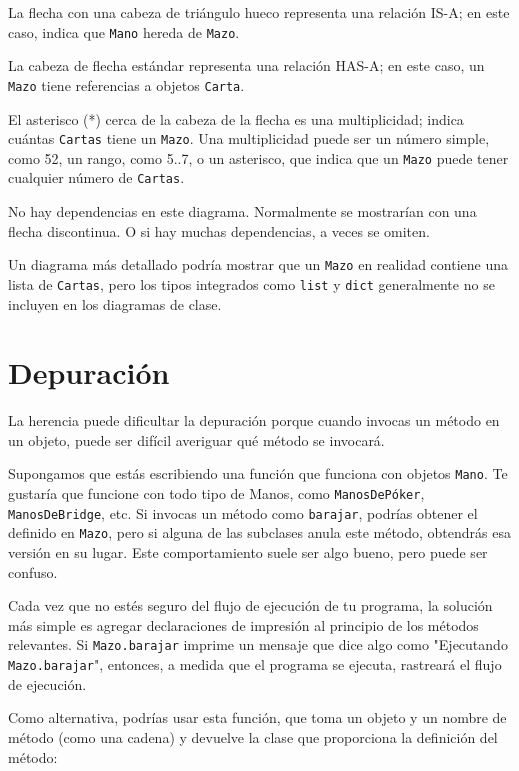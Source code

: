 La flecha con una cabeza de triángulo hueco representa una relación IS-A; en este caso, indica que \texttt{Mano} hereda de \texttt{Mazo}.

La cabeza de flecha estándar representa una relación HAS-A; en este caso, un \texttt{Mazo} tiene referencias a objetos \texttt{Carta}.

El asterisco (*) cerca de la cabeza de la flecha es una multiplicidad; indica cuántas \texttt{Cartas} tiene un \texttt{Mazo}. Una multiplicidad puede ser un número simple, como 52, un rango, como 5..7, o un asterisco, que indica que un \texttt{Mazo} puede tener cualquier número de \texttt{Cartas}.

No hay dependencias en este diagrama. Normalmente se mostrarían con una flecha discontinua. O si hay muchas dependencias, a veces se omiten.

Un diagrama más detallado podría mostrar que un \texttt{Mazo} en realidad contiene una lista de \texttt{Cartas}, pero los tipos integrados como \texttt{list} y \texttt{dict} generalmente no se incluyen en los diagramas de clase.

\section{Depuración}

La herencia puede dificultar la depuración porque cuando invocas un método en un objeto, puede ser difícil averiguar qué método se invocará.

Supongamos que estás escribiendo una función que funciona con objetos \texttt{Mano}. Te gustaría que funcione con todo tipo de Manos, como \texttt{ManosDePóker}, \texttt{ManosDeBridge}, etc. Si invocas un método como \texttt{barajar}, podrías obtener el definido en \texttt{Mazo}, pero si alguna de las subclases anula este método, obtendrás esa versión en su lugar. Este comportamiento suele ser algo bueno, pero puede ser confuso.

Cada vez que no estés seguro del flujo de ejecución de tu programa, la solución más simple es agregar declaraciones de impresión al principio de los métodos relevantes. Si \texttt{Mazo.barajar} imprime un mensaje que dice algo como "Ejecutando \texttt{Mazo.barajar}", entonces, a medida que el programa se ejecuta, rastreará el flujo de ejecución.

Como alternativa, podrías usar esta función, que toma un objeto y un nombre de método (como una cadena) y devuelve la clase que proporciona la definición del método:

